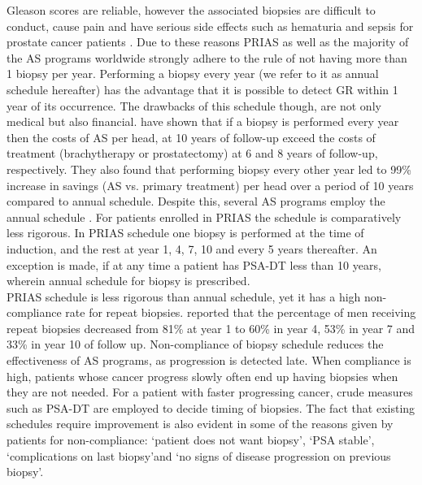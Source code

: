 Gleason scores are reliable, however the associated biopsies are difficult to conduct, cause pain and have serious side effects such as hematuria and sepsis for prostate cancer patients \citep{loeb2013systematic}. Due to these reasons PRIAS as well as the majority of the AS programs worldwide strongly adhere to the rule of not having more than 1 biopsy per year. Performing a biopsy every year (we refer to it as annual schedule hereafter) has the advantage that it is possible to detect GR within 1 year of its occurrence. The drawbacks of this schedule though, are not only medical but also financial. \cite{keegan2012active} have shown that if a biopsy is performed every year then the costs of AS per head, at 10 years of follow-up exceed the costs of treatment (brachytherapy or prostatectomy) at 6 and 8 years of follow-up, respectively. They also found that performing biopsy every other year led to 99\% increase in savings (AS vs. primary treatment) per head over a period of 10 years compared to annual schedule. Despite this, several AS programs employ the annual schedule \citep{tosoian2011active,welty2015extended}. For patients enrolled in PRIAS the schedule is comparatively less rigorous. In PRIAS schedule one biopsy is performed at the time of induction, and the rest at year 1, 4, 7, 10 and every 5 years thereafter. An exception is made, if at any time a patient has PSA-DT less than 10 years, wherein annual schedule for biopsy is prescribed.\\

PRIAS schedule is less rigorous than annual schedule, yet it has a high non-compliance rate for repeat biopsies. \cite{bokhorst2015compliance} reported that the percentage of men receiving repeat biopsies decreased from 81\% at year 1 to 60\% in year 4, 53\% in year 7 and 33\% in year 10 of follow up. Non-compliance of biopsy schedule reduces the effectiveness of AS programs, as progression is detected late. When compliance is high, patients whose cancer progress slowly often end up having biopsies when they are not needed. For a patient with faster progressing cancer, crude measures such as PSA-DT are employed to decide timing of biopsies. The fact that existing schedules require improvement is also evident in some of the reasons given by patients for non-compliance: \textquoteleft patient does not want biopsy\textquoteright, \textquoteleft PSA stable\textquoteright, \textquoteleft complications on last biopsy\textquoteright and \textquoteleft no signs of disease progression on previous biopsy\textquoteright.\\ 

